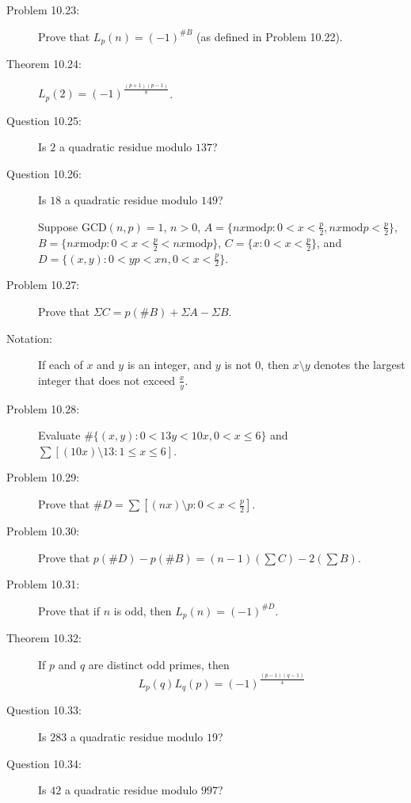 \documentclass{article}
\begin{document}
\begin{description}
  \item[Problem 10.23:] Prove that $L_p(n)=(-1)^{\#B}$ (as defined in Problem 10.22).

  \item[Theorem 10.24:] $L_p(2)=(-1)^{\frac{(p+1)(p-1)}{8}}$.

  \item[Question 10.25:] Is $2$ a quadratic residue modulo $137$?

  \item[Question 10.26:] Is $18$ a quadratic residue modulo $149$?

  \item[] Suppose $\text{GCD}(n,p)=1$, $n>0$, $A= \{ nx \text{mod} p: 0<x< \frac{p}{2}, nx \text{mod} p < \frac{p}{2} \}$, $B= \{ nx \text{mod} p: 0<x< \frac{p}{2} < nx \text{mod} p \}$, $C= \{ x: 0<x< \frac{p}{2} \}$, and $D= \{ (x,y): 0 < yp < xn, 0 < x < \frac{p}{2} \}$.

  \item[Problem 10.27:] Prove that $\Sigma C = p(\#B)+\Sigma A-\Sigma B$.

  \item[Notation:] If each of $x$ and $y$ is an integer, and $y$ is not $0$, then $x \setminus y$ denotes the largest integer that does not exceed $\frac{x}{y}$.

  \item[Problem 10.28:] Evaluate $\# \{ (x,y): 0<13y<10x, 0<x \leq 6 \}$ and $\sum [(10x) \setminus 13: 1 \leq x \leq 6]$.

  \item[Problem 10.29:] Prove that $\#D = \sum [(nx) \setminus p: 0<x< \frac{p}{2}]$.

  \item[Problem 10.30:] Prove that $p(\#D)-p(\#B) = (n-1)(\sum C)-2(\sum B)$.

  \item[Problem 10.31:] Prove that if $n$ is odd, then $L_p(n)=(-1)^{\#D}$.

  \item[Theorem 10.32:] If $p$ and $q$ are distinct odd primes, then
    \begin{equation*}
    L_p (q) L_q (p) = (-1)^{ \frac{(p-1)(q-1)}{4} }
    \end{equation*}

  \item[Question 10.33:] Is $283$ a quadratic residue modulo $19$?

  \item[Question 10.34:] Is $42$ a quadratic residue modulo $997$?


\end{description}
\end{document}
